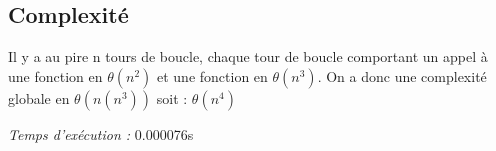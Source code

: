 \subsection{Complexité}

Il y a au pire n tours de boucle, chaque tour de boucle comportant un appel à une fonction en $\theta{(n^2)}$ et une fonction en $\theta{(n^3)}$. On a donc une complexité globale en $\theta{(n(n^3))}$ soit :
$\theta{(n^4)}$

\emph{Temps d'exécution :} 0.000076s
